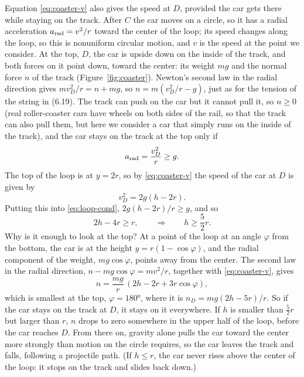 \documentclass[11pt,a4paper]{article}
\begin{document}
Equation \eqref{eq:coaster-v} also gives the speed at $D$, provided the car gets there while staying
on the track. After $C$ the car moves on a circle, so it has a radial acceleration
$a_{\mathrm{rad}} = v^2/r$ toward the center of the loop; its speed changes along the loop, so this is
nonuniform circular motion, and $v$ is the speed at the point we consider. At
the top, $D$, the car is upside down on the inside of the track, and both forces on it point down,
toward the center: its weight $mg$ and the normal force $n$ of the track
(Figure~\ref{fig:coaster}). Newton's second law in the radial direction gives
$mv_D^2/r = n + mg$, so $n = m(v_D^2/r - g)$, just as for the tension of the string in
\textup{(6.19)}. The track can push on the car but it cannot pull it, so $n \geq 0$ (real
roller-coaster cars have wheels on both sides of the rail, so that the track can also pull them, but
here we consider a car that simply runs on the inside of the track), and the car stays on the track
at the top only if
\begin{equation}\label{eq:loop-cond}
  a_{\mathrm{rad}} = \frac{v_D^2}{r} \geq g .
\end{equation}
The top of the loop is at $y = 2r$, so by \eqref{eq:coaster-v} the speed of the car at $D$ is given
by
\begin{equation}\label{eq:loop-vD}
  v_D^2 = 2g(h - 2r) .
\end{equation}
Putting this into \eqref{eq:loop-cond}, $2g(h - 2r)/r \geq g$, and so
\begin{equation}\label{eq:loop-h}
  2h - 4r \geq r , \qquad\Rightarrow\qquad h \geq \frac52 r .
\end{equation}
Why is it enough to look at the top? At a point of the loop at an angle $\varphi$ from the bottom,
the car is at the height $y = r(1 - \cos\varphi)$, and the radial component of the weight,
$mg\cos\varphi$, points away from the center. The second law in the radial direction,
$n - mg\cos\varphi = mv^2/r$, together with \eqref{eq:coaster-v}, gives
\[
  n = \frac{mg}{r}\,(2h - 2r + 3r\cos\varphi) ,
\]
which is smallest at the top, $\varphi = \ang{180}$, where it is $n_D = mg(2h - 5r)/r$. So if the
car stays on the track at $D$, it stays on it everywhere. If $h$ is smaller than $\frac52 r$ but
larger than $r$, $n$ drops to zero somewhere in the upper half of the loop, before the car reaches
$D$. From there on, gravity alone pulls the car toward the center more strongly than motion on the
circle requires, so the car leaves the track and falls, following a projectile path. (If
$h \leq r$, the car never rises above the center of the loop: it stops on the track and slides back
down.)
\end{document}
